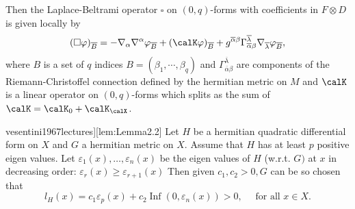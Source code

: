 \documentclass[lang=en,12pt]{beautybook}
\begin{document}
Then the Laplace-Beltrami operator $\square$ on $(0,q)$-forms with coefficients in $F\otimes D$ is given locally by
\begin{equation}
  \label{Local expression of Laplace-Beltrami operator}
  (\square\varphi)_{\overline{B}}=-\nabla_\alpha\nabla^\alpha\varphi_{\overline{B}}+(\calK\varphi)_{\overline{B}}+\sum g^{\overline{\alpha}\beta}\Gamma_{\overline{\alpha}\beta}^{\overline{\lambda}}\nabla_{\overline{\lambda}}\varphi_{\overline{B}},
\end{equation}
where $B$ is a set of $q$ indices $B=(\beta_1,\cdots,\beta_q)$ and $\Gamma_{\overline{\alpha}\beta}^{\overline{\lambda}}$ are components of the Riemann-Christoffel connection defined by the hermitian metric on $M$ and $\calK$ is a linear operator on $(0,q)$-forms which splits as the sum of $\calK=\calK_0+\calK_\calX$.

\begin{lemma}[][\cite[Lemma 2.2 by E. Calabi, P80]{vesentini1967lectures}][lem:Lemma2.2]
  Let $H$ be a hermitian quadratic differential form on $X$ and $G$ a hermitian metric on $X$. Assume that $H$ has at least $p$ positive eigen values. Let $\varepsilon_1(x), \ldots, \varepsilon_n(x)$ be the eigen values of $H$ (w.r.t.
  $G)$ at $x$ in decreasing order: $\varepsilon_r(x) \geq \varepsilon_{r+1}(x)$
  Then given $c_1, c_2>0, G$ can be so chosen that
  \begin{equation*}
    l_H(x)=c_1 \varepsilon_p(x)+c_2 \operatorname{Inf}\left(0, \varepsilon_n(x)\right)>0,\quad  \text { for all } x \in X .
  \end{equation*}
\end{lemma}
\end{document}
